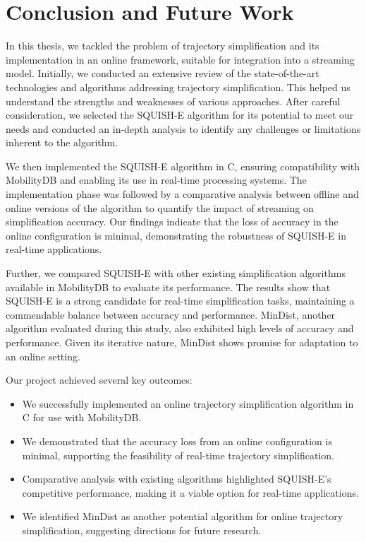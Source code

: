 
\chapter{Conclusion and Future Work}

In this thesis, we tackled the problem of trajectory simplification and its implementation in an online framework, suitable for integration into a streaming model. Initially, we conducted an extensive review of the state-of-the-art technologies and algorithms addressing trajectory simplification. This helped us understand the strengths and weaknesses of various approaches. After careful consideration, we selected the SQUISH-E algorithm for its potential to meet our needs and conducted an in-depth analysis to identify any challenges or limitations inherent to the algorithm.

We then implemented the SQUISH-E algorithm in C, ensuring compatibility with MobilityDB and enabling its use in real-time processing systems. The implementation phase was followed by a comparative analysis between offline and online versions of the algorithm to quantify the impact of streaming on simplification accuracy. Our findings indicate that the loss of accuracy in the online configuration is minimal, demonstrating the robustness of SQUISH-E in real-time applications.

Further, we compared SQUISH-E with other existing simplification algorithms available in MobilityDB to evaluate its performance. The results show that SQUISH-E is a strong candidate for real-time simplification tasks, maintaining a commendable balance between accuracy and performance. MinDist, another algorithm evaluated during this study, also exhibited high levels of accuracy and performance. Given its iterative nature, MinDist shows promise for adaptation to an online setting.

Our project achieved several key outcomes:
\begin{itemize}
    \item We successfully implemented an online trajectory simplification algorithm in C for use with MobilityDB.
    \item We demonstrated that the accuracy loss from an online configuration is minimal, supporting the feasibility of real-time trajectory simplification.
    \item Comparative analysis with existing algorithms highlighted SQUISH-E's competitive performance, making it a viable option for real-time applications.
    \item We identified MinDist as another potential algorithm for online trajectory simplification, suggesting directions for future research.
\end{itemize}

